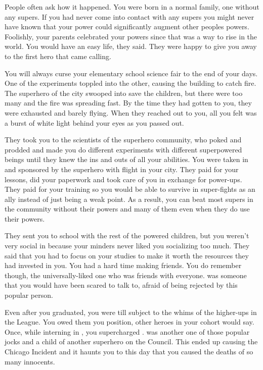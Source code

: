\documentclass[char]{LRSguildcamp1}
\begin{document}
\name{\cYS{}}

People often ask how it happened. You were born in a normal family, one without any supers. If you had never come into contact with any supers you might never have known that your power could significantly augment other peoples powers. Foolishly, your parents celebrated your powers since that was a way to rise in the world. You would have an easy life, they said. They were happy to give you away to the first hero that came calling. 

You will always curse your elementary school science fair to the end of your days. One of the experiments toppled into the other, causing the building to catch fire. The superhero of the city swooped into save the children, but there were too many and the fire was spreading fast. By the time they had gotten to you, they were exhausted and barely flying. When they reached out to you, all you felt was a burst of white light behind your eyes as you passed out. 

They took you to the scientists of the superhero community, who poked and prodded and made you do different experiments with different superpowered beings until they knew the ins and outs of all your abilities. You were taken in and sponsored by the superhero with flight in your city. They paid for your lessons, did your paperwork and took care of you in exchange for power-ups. They paid for your training so you would be able to survive in super-fights as an ally instead of just being a weak point. As a result, you can beat most supers in the community without their powers and many of them even when they do use their powers. 

They sent you to school with the rest of the powered children, but you weren't very social in \pSuperSchool{} because your minders never liked you socializing too much. They said that you had to focus on your studies to make it worth the resources they had invested in you. You had a hard time making friends. You do remember \cYoungest{} though, the universally-liked one who was friends with everyone. \cYoungest{} was someone that you would have been scared to talk to, afraid of being rejected by this popular person.  

Even after you graduated, you were till subject to the whims of the higher-ups in the League. You owed them you position, other heroes in your cohort would say. Once, while interning in \pCityO{} , you supercharged \cJuggernaut{}.  \cJuggernaut{} was another one of those popular jocks and a child of another superhero on the Council. This ended up causing the Chicago Incident and it haunts you to this day that you caused the deaths of so many innocents. 
\end{document}
